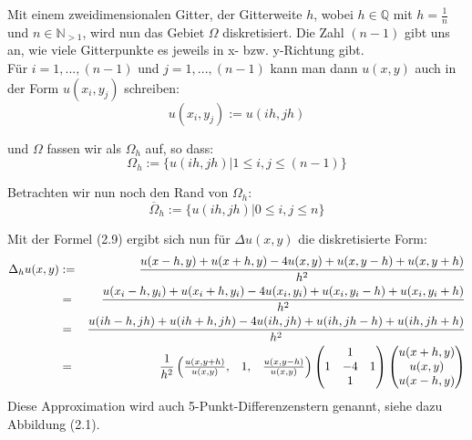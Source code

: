 Mit einem zweidimensionalen Gitter, der Gitterweite $h$, wobei $h \in \mathbb{Q}$ mit $h = \frac {1} {n}$ und $n \in \mathbb{N}_{>1}$, wird nun das Gebiet $\Omega$ diskretisiert. Die Zahl $(n-1)$ gibt uns an, wie viele Gitterpunkte es jeweils in x- bzw. y-Richtung gibt.\\

Für $i = 1,...,(n-1)$ und $j = 1,...,(n-1)$ kann man dann $u(x,y)$ auch in der Form $u(x_{i},y_{j})$ schreiben:
\begin{equation}
u(x_{i},y_{j}) := u(ih,jh)
\end{equation}

und $\Omega$ fassen wir als $\Omega_{h}$ auf, so dass:
\begin{equation}
\Omega_{h} := \{u(ih, jh) | 1 \le i,j \le (n-1)\}
\end{equation}

Betrachten wir nun noch den Rand von $\Omega_{h}$:
\begin{equation}
\overline \Omega_{h} := \{u(ih, jh) | 0 \le i,j \le n\}
\end{equation}

Mit der Formel (2.9) ergibt sich nun für $\Delta u(x,y)$ die diskretisierte Form:
\begin{eqnarray}
\Delta_{h} u(x,y) &:=& \frac {u(x-h,y) + u(x+h,y) - 4u(x,y) + u(x,y-h) + u(x,y+h)} {h^{2}} \notag \\
&=& \frac {u(x_{i}-h,y_{i}) + u(x_{i}+h,y_{i}) - 4u(x_{i},y_{i}) + u(x_{i},y_{i}-h) + u(x_{i},y_{i}+h)} {h^{2}} \notag \\
&=& \frac {u(ih-h,jh)+u(ih+h,jh)-4u(ih,jh)+u(ih,jh-h)+u(ih,jh+h)} {h^{2}} \notag \\
&=& \frac {1} {h^{2}}
\begin{pmatrix}
\frac {u(x,y+h)} {u(x,y)}, & 1, & \frac {u(x,y-h)} {u(x,y)}
\end{pmatrix}
\begin{pmatrix}
  & 1 & \\
1 & -4 & 1 \\
  & 1 & 
\end{pmatrix}
\begin{pmatrix}
u(x+h,y) \\
u(x,y) \\
u(x-h,y)
\end{pmatrix}
\end{eqnarray}
Diese Approximation wird auch 5-Punkt-Differenzenstern genannt, siehe dazu Abbildung (2.1).


